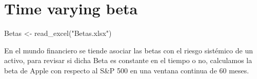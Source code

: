 \documentclass[
  12pt,
]{article}
\newenvironment{Shaded}{\begin{snugshade}}{\end{snugshade}}
\newcommand{\AttributeTok}[1]{\textcolor[rgb]{0.77,0.63,0.00}{#1}}
\newcommand{\ConstantTok}[1]{\textcolor[rgb]{0.00,0.00,0.00}{#1}}
\newcommand{\ControlFlowTok}[1]{\textcolor[rgb]{0.13,0.29,0.53}{\textbf{#1}}}
\newcommand{\DecValTok}[1]{\textcolor[rgb]{0.00,0.00,0.81}{#1}}
\newcommand{\FunctionTok}[1]{\textcolor[rgb]{0.00,0.00,0.00}{#1}}
\newcommand{\NormalTok}[1]{#1}
\newcommand{\OtherTok}[1]{\textcolor[rgb]{0.56,0.35,0.01}{#1}}
\newcommand{\SpecialCharTok}[1]{\textcolor[rgb]{0.00,0.00,0.00}{#1}}
\newcommand{\StringTok}[1]{\textcolor[rgb]{0.31,0.60,0.02}{#1}}
\begin{document}
\hypertarget{time-varying-beta}{%
\section{Time varying beta}\label{time-varying-beta}}

\begin{Shaded}
\begin{Highlighting}[]
\NormalTok{Betas }\OtherTok{\textless{}{-}} \FunctionTok{read\_excel}\NormalTok{(}\StringTok{"Betas.xlsx"}\NormalTok{)}
\end{Highlighting}
\end{Shaded}

En el mundo financiero se tiende asociar las betas con el riesgo
sistémico de un activo, para revisar si dicha Beta es constante en el
tiempo o no, calculamos la beta de Apple con respecto al S\&P 500 en una
ventana continua de 60 meses.

\begin{Shaded}
\end{Shaded}
\end{document}
